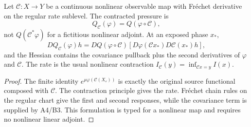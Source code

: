 \begin{theorem}
\label{thm:r10-c2-main}
Let \(\mathcal C:X\to Y\) be a continuous nonlinear observable map with
Fr\'echet derivative on the regular rate sublevel.  The contracted pressure is
\[
 Q_{\mathcal C}(\varphi)=Q(\varphi\circ\mathcal C),
\]
not \(Q(\mathcal C^*\varphi)\) for a fictitious nonlinear adjoint.  At an
exposed phase \(x_*\),
\[
 DQ_{\mathcal C}(\varphi)h
 =DQ(\varphi\circ\mathcal C)
   [D\varphi(\mathcal Cx_*)D\mathcal C(x_*)h],
\]
and the Hessian contains the covariance pullback plus the second derivatives
of \(\varphi\) and \(\mathcal C\).  The rate is the usual nonlinear
contraction \(I_{\mathcal C}(y)=\inf_{\mathcal Cx=y}I(x)\).
\end{theorem}

\begin{proof}
The finite identity
\(e^{\mu\varphi(\mathcal C(X_\varepsilon))}\) is exactly the original source
functional composed with \(\mathcal C\).  The contraction principle gives the
rate.  Fr\'echet chain rules on the regular chart give the first and second
responses, while the covariance term is supplied by A4/B3.  This formulation
is typed for a nonlinear map and requires no nonlinear linear adjoint.
\end{proof}
